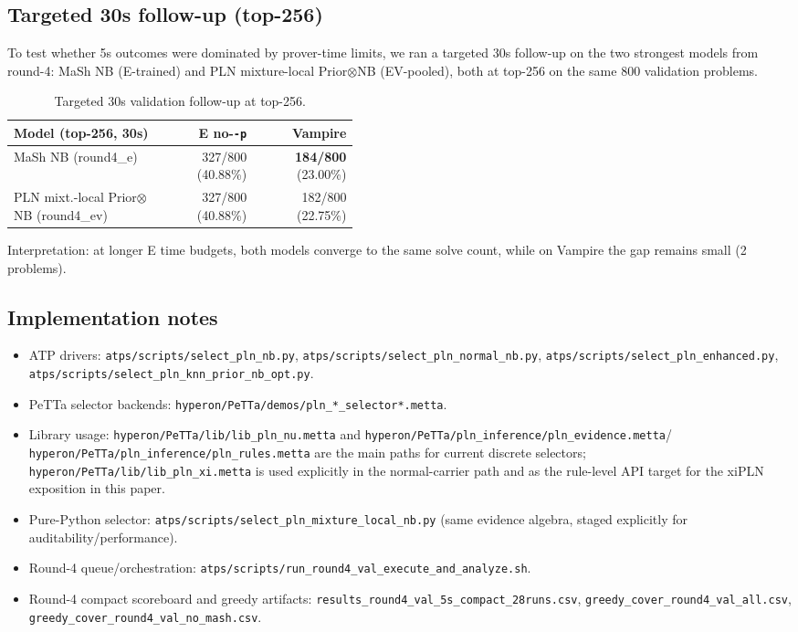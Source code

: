 \documentclass[11pt]{article}
\newcommand{\lpath}[1]{\texttt{\nolinkurl{#1}}}
\begin{document}
\subsection{Targeted 30s follow-up (top-256)}
To test whether 5s outcomes were dominated by prover-time limits, we ran a
targeted 30s follow-up on the two strongest models from round-4:
MaSh NB (E-trained) and PLN mixture-local Prior$\otimes$NB (EV-pooled), both at
top-256 on the same 800 validation problems.

\begin{table}[h]
\centering
\begin{small}
\begin{tabular}{p{0.44\linewidth}rr}
\toprule
Model (top-256, 30s) & E no-\texttt{-p} & Vampire \\
\midrule
MaSh NB (round4\_e) & 327/800 (40.88\%) & \textbf{184/800} (23.00\%) \\
PLN mixt.-local Prior$\otimes$NB (round4\_ev) & 327/800 (40.88\%) & 182/800 (22.75\%) \\
\bottomrule
\end{tabular}
\end{small}
\caption{Targeted 30s validation follow-up at top-256.}
\label{tab:r4val30}
\end{table}

Interpretation: at longer E time budgets, both models converge to the same solve
count, while on Vampire the gap remains small (2 problems).

\subsection{Implementation notes}
\begin{itemize}
\item ATP drivers:
      \lpath{atps/scripts/select_pln_nb.py},
      \lpath{atps/scripts/select_pln_normal_nb.py},
      \lpath{atps/scripts/select_pln_enhanced.py},
      \lpath{atps/scripts/select_pln_knn_prior_nb_opt.py}.
\item PeTTa selector backends:
      \lpath{hyperon/PeTTa/demos/pln_*_selector*.metta}.
\item Library usage:
      \lpath{hyperon/PeTTa/lib/lib_pln_nu.metta} and
      \lpath{hyperon/PeTTa/pln_inference/pln_evidence.metta}/
      \lpath{hyperon/PeTTa/pln_inference/pln_rules.metta} are the main paths for
      current discrete selectors; \lpath{hyperon/PeTTa/lib/lib_pln_xi.metta}
      is used explicitly in the normal-carrier path and as the rule-level API
      target for the xiPLN exposition in this paper.
\item Pure-Python selector:
      \lpath{atps/scripts/select_pln_mixture_local_nb.py}
      (same evidence algebra, staged explicitly for auditability/performance).
\item Round-4 queue/orchestration:
      \lpath{atps/scripts/run_round4_val_execute_and_analyze.sh}.
\item Round-4 compact scoreboard and greedy artifacts:
      \lpath{results_round4_val_5s_compact_28runs.csv},
      \lpath{greedy_cover_round4_val_all.csv},
      \lpath{greedy_cover_round4_val_no_mash.csv}.
\end{itemize}
\end{document}
